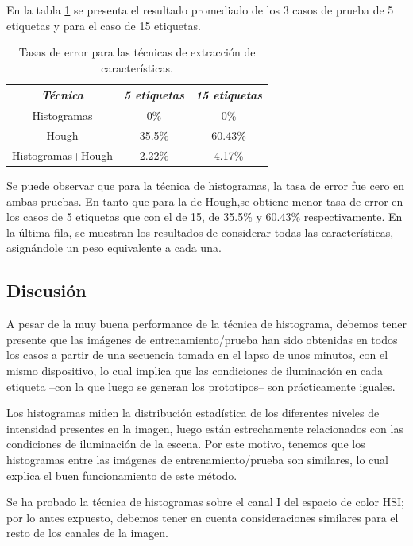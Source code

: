 \documentclass[conference,a4paper,10pt,oneside,final]{tfmpd}
\begin{document}
En la tabla \ref{tablaerrores} se presenta el resultado promediado de los 3
{casos de prueba} de 5 etiquetas {y para el caso de} 15 etiquetas.

\begin{table}
\caption{Tasas de error para {las técnicas de extracción de características}.}
\begin{center}\begin{tabular}{ccc}
\hline \emph{{Técnica}} & \emph{5 etiquetas} & \emph{15 etiquetas}\\
\hline Histogramas & 0\% & 0\%\\
\hline Hough & 35.5\% & 60.43\%\\
\hline Histogramas+Hough & 2.22\% & 4.17\%\\
\hline
\end{tabular}\end{center}
\label{tablaerrores}
\end{table}
%
Se puede observar que para {la técnica} de histogramas,
la tasa de error fue cero
en ambas pruebas. En tanto que para {la} de Hough,se obtiene menor tasa de
error {en los casos} de 5 etiquetas que con el de 15, de 35.5\% y 60.43\%
respectivamente. En la última fila, se muestran los resultados de
con\-si\-de\-rar todas las características, %
asignándole un peso equivalente a cada una.
%
%
\subsection*{Discusión}
A pesar de la muy buena performance de la técnica de histograma, debemos tener
presente que las  imágenes de entrenamiento/prueba han sido obtenidas
en todos los casos a partir de una secuencia tomada en el
lapso de unos minutos, con el mismo dispositivo, lo cual implica que las
condiciones de iluminación en cada etiqueta --con la que luego se generan
los prototipos-- son prácticamente iguales.

Los histogramas miden la distribución estadística de los diferentes niveles
de intensidad presentes en la imagen, luego están estrechamente relacionados
con las condiciones de iluminación de la escena. Por este motivo, tenemos
que los histogramas entre las imágenes de entrenamiento/prueba son
similares, lo cual explica el buen funcionamiento de este método.

Se ha probado la técnica de histogramas sobre el canal I del espacio de color
HSI; por lo antes expuesto, debemos tener en cuenta consideraciones similares
para el resto de los canales de la imagen.
\end{document}
